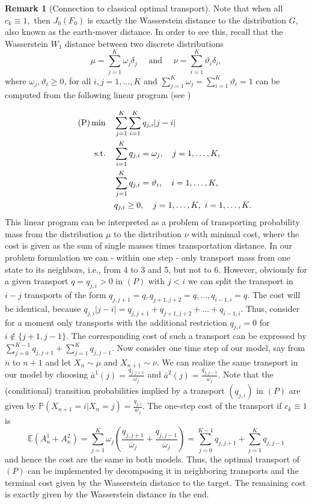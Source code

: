 \documentclass[reqno, 12pt]{amsart}%
\newcommand{\PP}{\mathbb{P}}
\newcommand{\EE}{\mathbb{E}}
\theoremstyle{definition}
\newtheorem{remark}[theorem]{Remark}
\numberwithin{equation}{section} \numberwithin{theorem}{section}
\begin{document}
\begin{remark}[Connection to classical optimal transport]
 Note that when  all 
 $c_k\equiv  1,$ then $J_0(F_0)$ is exactly the 
Wasserstein distance to the distribution $G$, 
 also known as the earth-mover distance.  In order to see this, recall that the Wasserstein $W_1$ distance between two discrete distributions
   \[
        \mu=\sum_{j=1}^{K}\omega_{j}\delta_{j} \quad \text{ and }\quad  \nu=\sum_{i=1}^{K}\vartheta_i\delta_{i},
    \]
    where $\omega_j, \vartheta_i \geq 0 $, for all $i,j=1,\ldots,K$   and $\sum_{j=1}^{K}\omega_j=\sum_{i=1}^{K}\vartheta_i=1$ can be computed from the following linear program (see \cite{kantorovich2006problem})

   \begin{align}\label{Prob:LP}\tag{P}
    \min \quad   &\sum_{j=1}^{K} \sum_{i=1}^{K}q_{j,i}|j-i|
    \\ \notag
    \text{s.t.} \quad  &\sum_{i=1}^{K}q_{j,i}=\omega_j, \quad  j=1,\ldots, K ,
    \\ \notag
   &\sum_{j=1}^{K}q_{j,i}=\vartheta_i, \quad  i=1,\ldots,K,
    \\ \notag
    &   q_{j,i} \geq 0, \quad j=1,\ldots,K, \ i=1,\ldots, K.
 \end{align} 
This linear program can be interpreted as a problem of transporting probability mass from the  distribution $\mu$ to the distribution $\nu$ with
minimal cost, where the cost is given as the sum of 
single masses times transportation distance. In our problem formulation we can - within one step - only transport mass from one state to its neighbors, i.e., from 4 to 3 and 5, but not to 6. However, obviously for a given transport $q=q_{j,i}>0$ in $(P)$ with $j<i$ we can split the transport in $i-j$ transports of the form $q_{j,j+1}=q, q_{j+1,j+2}=q,\ldots, q_{i-1,i}=q. $ The cost will be identical, because $q_{j,i}|j-i| = q_{j,j+1}+q_{j+1,j+2}+\ldots + q_{i-1,i}.$ Thus, consider for a moment only transports with the additional restriction $q_{j,i}=0$ for $i\notin \{j+1,j-1\}.$ The corresponding cost of such a transport can be expressed by $\sum_{j=0}^{K-1}q_{j,j+1} + \sum_{j=1}^K q_{j,j-1}.$
Now consider one time step of our model, say from $n$ to $n+1$ and let $X_n\sim\mu$ and $X_{n+1}\sim \nu.$   We can realize the same transport in our model by choosing $\bar{a}^1(j)= \frac{q_{j,j+1}}{\omega_j}$ and $\bar{a}^2(j)= \frac{q_{j,j-1}}{\omega_j}$. Note that the (conditional) transition probabilities implied by a transport $(q_{j,i})$ in $(P)$ are given by $\PP(X_{n+1}=i|X_n=j)= \frac{q_{j,i}}{w_j}.$ The one-step cost of the transport if $c_k\equiv 1$ is $$\EE(A_n^1+A_n^2)=\sum_{j=1}^K \omega_j (\frac{q_{j,j+1}}{\omega_j} + \frac{q_{j,j-1}}{\omega_j})= \sum_{j=0}^{K-1}q_{j,j+1} + \sum_{j=1}^K q_{j,j-1}$$
and hence the cost are the same in both models. Thus,  the optimal transport of $(P)$ can be implemented by decomposing it in neighboring transports and the terminal cost given by the Wasserstein distance to the target.  The remaining cost is exactly given by the Wasserstein distance in the end.


\end{remark}
\end{document}
